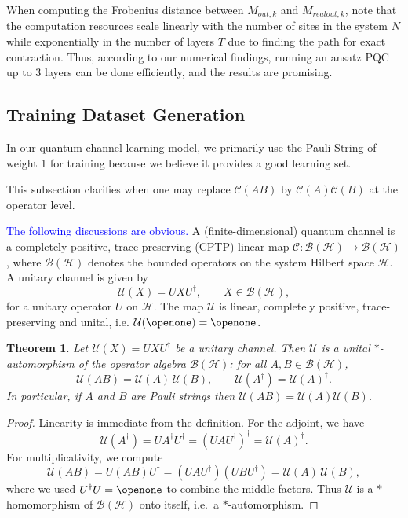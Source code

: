 \documentclass[%
 reprint,
superscriptaddress,
 amsmath,amssymb,
 aps,
]{revtex4-2}
\newtheorem{theorem}{Theorem}[section]
\newcommand{\yijian}[1]{\textcolor{blue}{#1}}
\begin{document}
When computing the Frobenius distance between $M_{out, k}$ and $M_{realout, k}$, note that the computation resources scale linearly with the number of sites in the system $N$ while exponentially in the number of layers $T$ due to finding the path for exact contraction. Thus, according to our numerical findings, running an ansatz PQC up to 3 layers can be done efficiently, and the results are promising.


\subsection{Training Dataset Generation}
\label{sec:Training_dataset_generation}

In our quantum channel learning model, we primarily use the Pauli String of weight 1 for training because we believe it provides a good learning set.

This subsection clarifies when one may replace $\mathcal{C}(AB)$ by $\mathcal{C}(A)\mathcal{C}(B)$ at the operator level.

\yijian{The following discussions are obvious.}
A (finite-dimensional) quantum channel is a completely positive,
trace-preserving (CPTP) linear map
\(\mathcal{C}:\mathcal{B}(\mathcal{H})\to\mathcal{B}(\mathcal{H})\),
where $\mathcal{B}(\mathcal{H})$ denotes the bounded operators on the system Hilbert space $\mathcal{H}$. A unitary channel is given by
\begin{equation}
  \mathcal{U}(X) = U X U^{\dagger},
  \qquad X\in\mathcal{B}(\mathcal{H}),
\end{equation}
for a unitary operator $U$ on $\mathcal{H}$. The map $\mathcal{U}$ is linear, completely positive, trace-preserving
and unital, i.e. $\mathcal{U}(\openone)=\openone$.

\begin{theorem}
Let $\mathcal{U}(X)=UXU^{\dagger}$ be a unitary channel. Then
$\mathcal{U}$ is a unital $*$-automorphism of the operator algebra
$\mathcal{B}(\mathcal{H})$: for all $A,B\in\mathcal{B}(\mathcal{H})$,
\begin{equation}
  \mathcal{U}(AB)=\mathcal{U}(A)\,\mathcal{U}(B),
  \qquad
  \mathcal{U}(A^{\dagger})=\mathcal{U}(A)^{\dagger}.
\end{equation}
In particular, if $A$ and $B$ are Pauli strings then
$\mathcal{U}(AB)=\mathcal{U}(A)\mathcal{U}(B)$.
\end{theorem}

\begin{proof}
Linearity is immediate from the definition. For the adjoint, we have
\begin{equation}
  \mathcal{U}(A^{\dagger})
  = U A^{\dagger} U^{\dagger}
  = (UAU^{\dagger})^{\dagger}
  = \mathcal{U}(A)^{\dagger}.
\end{equation}
For multiplicativity, we compute
\begin{equation}
  \mathcal{U}(AB)
  = U (AB) U^{\dagger}
  = (UAU^{\dagger})(UBU^{\dagger})
  = \mathcal{U}(A)\,\mathcal{U}(B),
\end{equation}
where we used $U^{\dagger}U=\openone$ to combine the middle factors.
Thus $\mathcal{U}$ is a $*$-homomorphism of $\mathcal{B}(\mathcal{H})$
onto itself, i.e.\ a $*$-automorphism.
\end{proof}
\end{document}
